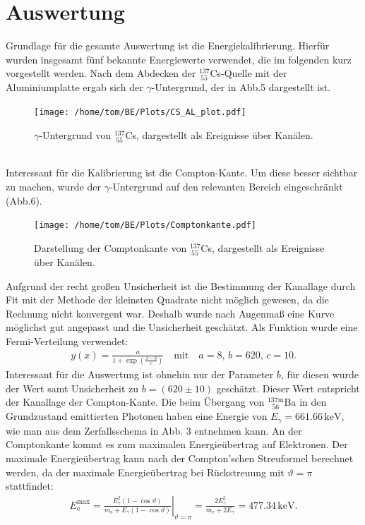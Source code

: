 \documentclass[german,  %
parskip=full,  %
]{scrartcl}
\begin{document}
\section{Auswertung}
Grundlage für die gesamte Auswertung ist die Energiekalibrierung. Hierfür wurden insgesamt fünf bekannte Energiewerte verwendet, die im folgenden kurz vorgestellt werden. Nach dem Abdecken der \(^{137}_{\ 55}\)Cs-Quelle mit der Aluminiumplatte ergab sich der \(\gamma\)-Untergrund, der in Abb.5 dargestellt ist.\\
\begin{figure}[h!]\centering
\texttt{[image: /home/tom/BE/Plots/CS\_AL\_plot.pdf]}
\label{Cs-Untergrund_Kanal}
\caption{\(\gamma\)-Untergrund von \(^{137}_{\ 55}\)Cs, dargestellt als Ereignisse über Kanälen.}
\end{figure}\\
Interessant für die Kalibrierung ist die Compton-Kante. Um diese besser sichtbar zu machen, wurde der \(\gamma\)-Untergrund auf den relevanten Bereich eingeschränkt (Abb.6). 
\newpage
\begin{figure}[h!]\centering
\texttt{[image: /home/tom/BE/Plots/Comptonkante.pdf]}
\label{Compton-Kante}
\caption{Darstellung der Comptonkante von \(^{137}_{\ 55}\)Cs, dargestellt als Ereignisse über Kanälen.}
\end{figure}
Aufgrund der recht großen Unsicherheit ist die Bestimmung der Kanallage durch Fit mit der Methode der kleinsten Quadrate nicht möglich gewesen, da die Rechnung nicht konvergent war. Deshalb wurde nach Augenmaß eine Kurve möglichst gut angepasst und die Unsicherheit geschätzt. Als Funktion wurde eine Fermi-Verteilung verwendet:
\begin{align*}
y(x) = \frac{a}{1 + \exp\left(\frac{x-b}{c}\right)} \quad\text{mit}\quad a = 8,\, b= 620,\, c= 10.
\end{align*}
Interessant für die Auswertung ist ohnehin nur der Parameter \(b\), für diesen wurde der Wert samt Unsicherheit zu \(b=(620\pm 10)\) geschätzt. Dieser Wert entspricht der Kanallage der Compton-Kante. Die beim Übergang von \(^{137\mathrm{m}}_{\ \ \ 56}\)Ba in den Grundzustand emittierten Photonen haben eine Energie von \(E_{\gamma} = 661.66\,\mathrm{keV}\), wie man aus dem Zerfallsschema in Abb. 3 entnehmen kann. An der Comptonkante kommt es zum maximalen Energieübertrag auf Elektronen. Der maximale Energieübertrag kann nach der Compton'schen Streuformel berechnet werden, da der maximale Energieübertrag bei Rückstreuung mit \(\vartheta=\pi\) stattfindet:
\begin{align*}
E_{\mathrm{e}}^{\mathrm{max}} = \left.\frac{E_{\gamma}^2(1-\cos\vartheta)}{m_{\mathrm{e}} + E_{\gamma}(1-\cos\vartheta)}\right|_{\vartheta=\pi} = \frac{2E_{\gamma}^2}{m_{\mathrm{e}} + 2E_{\gamma}} = 477.34\,\mathrm{keV}.
\end{align*}
\end{document}
